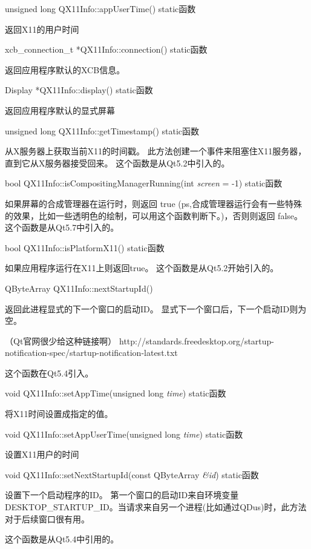 unsigned long QX11Info::appUserTime() static函数

返回X11的用户时间

xcb\_connection\_t *QX11Info::connection() static函数

返回应用程序默认的XCB信息。

Display *QX11Info::display() static函数

返回应用程序默认的显式屏幕

unsigned long QX11Info::getTimestamp() static函数

从X服务器上获取当前X11的时间戳。 此方法创建一个事件来阻塞住X11服务器，直到它从X服务器接受回来。 这个函数是从Qt5.2中引入的。

bool QX11Info::isCompositingManagerRunning(int \emph{screen} = -1) static函数

如果屏幕的合成管理器在运行时，则返回 true (ps,合成管理器运行会有一些特殊的效果，比如一些透明色的绘制，可以用这个函数判断下。)，否则则返回 false。 这个函数是从Qt5.7中引入的。

bool QX11Info::isPlatformX11() static函数

如果应用程序运行在X11上则返回true。 这个函数是从Qt5.2开始引入的。

QByteArray QX11Info::nextStartupId()

返回此进程显式的下一个窗口的启动ID。 显式下一个窗口后，下一个启动ID则为空。

（Qt官网很少给这种链接啊）
http://standards.freedesktop.org/startup-notification-spec/startup-notification-latest.txt

这个函数在Qt5.4引入。

void QX11Info::setAppTime(unsigned long \emph{time}) static函数

将X11时间设置成指定的值。

void QX11Info::setAppUserTime(unsigned long \emph{time}) static函数

设置X11用户的时间

void QX11Info::setNextStartupId(const QByteArray \emph{\&id}) static函数

设置下一个启动程序的ID。 第一个窗口的启动ID来自环境变量DESKTOP\_STARTUP\_ID。当请求来自另一个进程(比如通过QDus)时，此方法对于后续窗口很有用。

这个函数是从Qt5.4中引用的。





